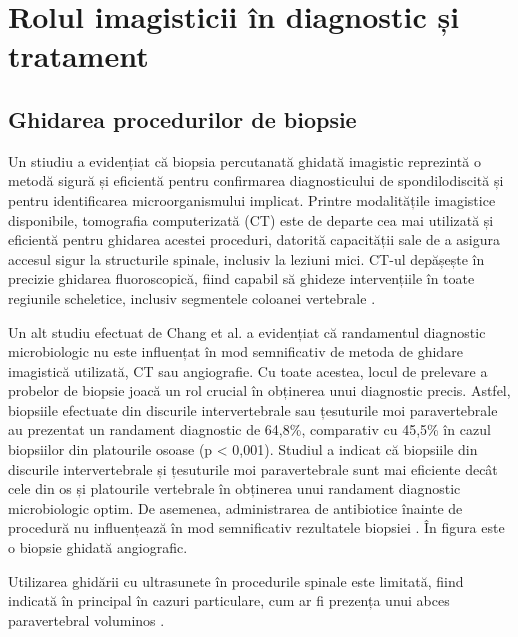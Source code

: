 \documentclass[romanian,12pt,a4paper]{article}
\begin{document}
\section{Rolul imagisticii în diagnostic și tratament}

\subsection{Ghidarea procedurilor de biopsie}

Un stiudiu a evidențiat că biopsia percutanată ghidată imagistic
reprezintă o metodă sigură și eficientă pentru confirmarea
diagnosticului de spondilodiscită și pentru identificarea
microorganismului implicat. Printre modalitățile imagistice disponibile,
tomografia computerizată (CT) este de departe cea mai utilizată și
eficientă pentru ghidarea acestei proceduri, datorită capacității sale
de a asigura accesul sigur la structurile spinale, inclusiv la leziuni
mici. CT-ul depășește în precizie ghidarea fluoroscopică, fiind capabil
să ghideze intervențiile în toate regiunile scheletice, inclusiv
segmentele coloanei vertebrale \cite{PercutaneousCTGuidedBone2023}.

Un alt studiu efectuat de Chang et al. a evidențiat că randamentul
diagnostic microbiologic nu este influențat în mod semnificativ de
metoda de ghidare imagistică utilizată, CT sau angiografie. Cu toate
acestea, locul de prelevare a probelor de biopsie joacă un rol crucial
în obținerea unui diagnostic precis. Astfel, biopsiile efectuate din
discurile intervertebrale sau țesuturile moi paravertebrale au prezentat
un randament diagnostic de 64,8\%, comparativ cu 45,5\% în cazul
biopsiilor din platourile osoase (p \textless{} 0,001). Studiul a
indicat că biopsiile din discurile intervertebrale și țesuturile moi
paravertebrale sunt mai eficiente decât cele din os și platourile
vertebrale în obținerea unui randament diagnostic microbiologic optim.
De asemenea, administrarea de antibiotice înainte de procedură nu
influențează în mod semnificativ rezultatele biopsiei
\cite{ImageGuidedBiopsyAcute2023}. În figura
 este o biopsie ghidată angiografic.

Utilizarea ghidării cu ultrasunete în procedurile spinale este limitată,
fiind indicată în principal în cazuri particulare, cum ar fi prezența
unui abces paravertebral voluminos
\cite{UltrasoundGuidedPercutaneousBone2023}.
\end{document}
